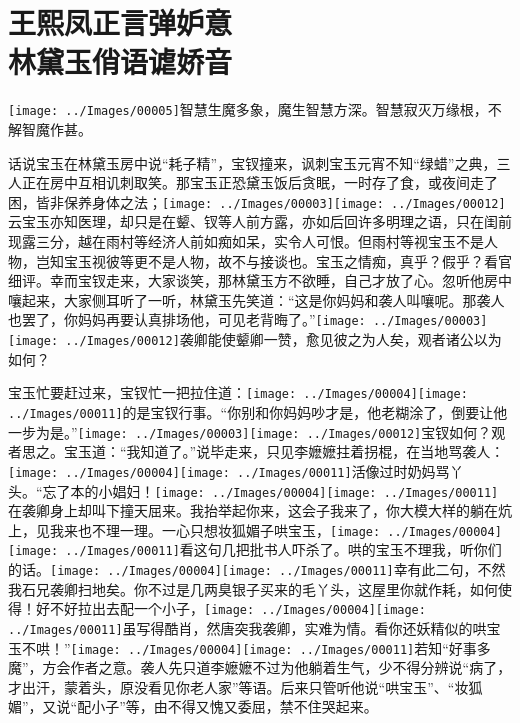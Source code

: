 

\chapter{王熙凤正言弹妒意\\林黛玉俏语谑娇音}\label{part0024_split_000.htmlux5cux23calibre_pb_0}

{\texttt{[image: ../Images/00005]}智慧生魔多象，魔生智慧方深。智慧寂灭万缘根，不解智魔作甚。}

话说宝玉在林黛玉房中说``耗子精''，宝钗撞来，讽刺宝玉元宵不知``绿蜡''之典，三人正在房中互相讥刺取笑。那宝玉正恐黛玉饭后贪眠，一时存了食，或夜间走了困，皆非保养身体之法；{\texttt{[image: ../Images/00003]}\texttt{[image: ../Images/00012]}\footnotesize \kaishu 云宝玉亦知医理，却只是在颦、钗等人前方露，亦如后回许多明理之语，只在闺前现露三分，越在雨村等经济人前如痴如呆，实令人可恨。但雨村等视宝玉不是人物，岂知宝玉视彼等更不是人物，故不与接谈也。宝玉之情痴，真乎？假乎？看官细评。}幸而宝钗走来，大家谈笑，那林黛玉方不欲睡，自己才放了心。忽听他房中嚷起来，大家侧耳听了一听，林黛玉先笑道：``这是你妈妈和袭人叫嚷呢。那袭人也罢了，你妈妈再要认真排场他，可见老背晦了。''{\texttt{[image: ../Images/00003]}\texttt{[image: ../Images/00012]}\footnotesize \kaishu 袭卿能使颦卿一赞，愈见彼之为人矣，观者诸公以为如何？}

宝玉忙要赶过来，宝钗忙一把拉住道：{\texttt{[image: ../Images/00004]}\texttt{[image: ../Images/00011]}\footnotesize \kaishu 的是宝钗行事。}``你别和你妈妈吵才是，他老糊涂了，倒要让他一步为是。''{\texttt{[image: ../Images/00003]}\texttt{[image: ../Images/00012]}\footnotesize \kaishu 宝钗如何？观者思之。}宝玉道：``我知道了。''说毕走来，只见李嬷嬷拄着拐棍，在当地骂袭人：{\texttt{[image: ../Images/00004]}\texttt{[image: ../Images/00011]}\footnotesize \kaishu 活像过时奶妈骂丫头。}``忘了本的小娼妇！{\texttt{[image: ../Images/00004]}\texttt{[image: ../Images/00011]}\footnotesize \kaishu 在袭卿身上却叫下撞天屈来。}我抬举起你来，这会子我来了，你大模大样的躺在炕上，见我来也不理一理。一心只想妆狐媚子哄宝玉，{\texttt{[image: ../Images/00004]}\texttt{[image: ../Images/00011]}\footnotesize \kaishu 看这句几把批书人吓杀了。}哄的宝玉不理我，听你们的话。{\texttt{[image: ../Images/00004]}\texttt{[image: ../Images/00011]}\footnotesize \kaishu 幸有此二句，不然我石兄袭卿扫地矣。}你不过是几两臭银子买来的毛丫头，这屋里你就作耗，如何使得！好不好拉出去配一个小子，{\texttt{[image: ../Images/00004]}\texttt{[image: ../Images/00011]}\footnotesize \kaishu 虽写得酷肖，然唐突我袭卿，实难为情。}看你还妖精似的哄宝玉不哄！''{\texttt{[image: ../Images/00004]}\texttt{[image: ../Images/00011]}\footnotesize \kaishu 若知``好事多魔''，方会作者之意。}袭人先只道李嬷嬷不过为他躺着生气，少不得分辨说``病了，才出汗，蒙着头，原没看见你老人家''等语。后来只管听他说``哄宝玉''、``妆狐媚''，又说``配小子''等，由不得又愧又委屈，禁不住哭起来。

